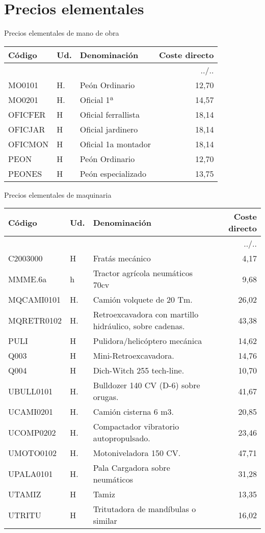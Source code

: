 \documentclass{book}%
\begin{document}
%
\normalsize%
\part{Precios elementales}%
\label{sec:Precioselementales}%
\begin{center}
%
\Large%
 Precios elementales de mano de obra %
\normalsize%
\end{center}
%
\small%
\begin{longtable}{|l|l|p{4cm}|r|}%
\hline%
Código&Ud.&Denominación&Coste directo\\%
\hline%
\endhead%
\hline%
\multicolumn{4}{|r|}{../..}\\%
\hline%
\endfoot%
\hline%
\endlastfoot%
MO0101&H.&Peón Ordinario&     12,70\\%
MO0201&H.&Oficial 1ª&     14,57\\%
OFICFER&H&Oficial ferrallista&     18,14\\%
OFICJAR&H&Oficial jardinero&     18,14\\%
OFICMON&H&Oficial 1a montador&     18,14\\%
PEON&H&Peón Ordinario&     12,70\\%
PEONES&H&Peón especializado&     13,75\\%
\end{longtable}%
\normalsize%
\begin{center}
%
\Large%
 Precios elementales de maquinaria %
\normalsize%
\end{center}
%
\small%
\begin{longtable}{|l|l|p{4cm}|r|}%
\hline%
Código&Ud.&Denominación&Coste directo\\%
\hline%
\endhead%
\hline%
\multicolumn{4}{|r|}{../..}\\%
\hline%
\endfoot%
\hline%
\endlastfoot%
C2003000&H&Fratás mecánico&      4,17\\%
MMME.6a&h&Tractor agrícola neumáticos 70cv&      9,68\\%
MQCAMI0101&H.&Camión volquete de 20 Tm.&     26,02\\%
MQRETR0102&H.&Retroexcavadora con martillo hidráulico, sobre cadenas.&     43,38\\%
PULI&H&Pulidora/helicóptero mecánica&     14,62\\%
Q003&H&Mini{-}Retroexcavadora.&     14,76\\%
Q004&H&Dich{-}Witch 255 tech{-}line.&     10,70\\%
UBULL0101&H.&Bulldozer 140 CV (D{-}6) sobre orugas.&     41,67\\%
UCAMI0201&H.&Camión cisterna 6 m3.&     20,85\\%
UCOMP0202&H.&Compactador vibratorio autopropulsado.&     23,46\\%
UMOTO0102&H.&Motoniveladora 150 CV.&     47,71\\%
UPALA0101&H.&Pala Cargadora sobre neumáticos&     31,28\\%
UTAMIZ&H&Tamiz&     13,35\\%
UTRITU&H&Tritutadora de mandíbulas o similar&     16,02\\%
\end{longtable}%
\end{document}
